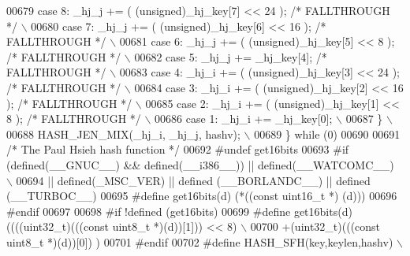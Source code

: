 \begin{DoxyCode}
{{{{{{{{00679 \textcolor{preprocessor}{    case 8:  \_hj\_j += ( (unsigned)\_hj\_key[7] << 24 );  }\textcolor{comment}{/* FALLTHROUGH */}\textcolor{preprocessor}{         \(\backslash\)}
00680 \textcolor{preprocessor}{    case 7:  \_hj\_j += ( (unsigned)\_hj\_key[6] << 16 );  }\textcolor{comment}{/* FALLTHROUGH */}\textcolor{preprocessor}{         \(\backslash\)}
00681 \textcolor{preprocessor}{    case 6:  \_hj\_j += ( (unsigned)\_hj\_key[5] << 8 );   }\textcolor{comment}{/* FALLTHROUGH */}\textcolor{preprocessor}{         \(\backslash\)}
00682 \textcolor{preprocessor}{    case 5:  \_hj\_j += \_hj\_key[4];                      }\textcolor{comment}{/* FALLTHROUGH */}\textcolor{preprocessor}{         \(\backslash\)}
00683 \textcolor{preprocessor}{    case 4:  \_hj\_i += ( (unsigned)\_hj\_key[3] << 24 );  }\textcolor{comment}{/* FALLTHROUGH */}\textcolor{preprocessor}{         \(\backslash\)}
00684 \textcolor{preprocessor}{    case 3:  \_hj\_i += ( (unsigned)\_hj\_key[2] << 16 );  }\textcolor{comment}{/* FALLTHROUGH */}\textcolor{preprocessor}{         \(\backslash\)}
00685 \textcolor{preprocessor}{    case 2:  \_hj\_i += ( (unsigned)\_hj\_key[1] << 8 );   }\textcolor{comment}{/* FALLTHROUGH */}\textcolor{preprocessor}{         \(\backslash\)}
00686 \textcolor{preprocessor}{    case 1:  \_hj\_i += \_hj\_key[0];                                                \(\backslash\)}
00687 \textcolor{preprocessor}{  \}                                                                              \(\backslash\)}
00688 \textcolor{preprocessor}{  HASH\_JEN\_MIX(\_hj\_i, \_hj\_j, hashv);                                             \(\backslash\)}
00689 \textcolor{preprocessor}{\} while (0)}
00690 
00691 \textcolor{comment}{/* The Paul Hsieh hash function */}
00692 \textcolor{preprocessor}{#undef get16bits}
00693 \textcolor{preprocessor}{#if (defined(\_\_GNUC\_\_) && defined(\_\_i386\_\_)) || defined(\_\_WATCOMC\_\_)             \(\backslash\)}
00694 \textcolor{preprocessor}{  || defined(\_MSC\_VER) || defined (\_\_BORLANDC\_\_) || defined (\_\_TURBOC\_\_)}
00695 \textcolor{preprocessor}{#define get16bits(d) (*((const uint16\_t *) (d)))}
00696 \textcolor{preprocessor}{#endif}
00697 
00698 \textcolor{preprocessor}{#if !defined (get16bits)}
00699 \textcolor{preprocessor}{#define get16bits(d) ((((uint32\_t)(((const uint8\_t *)(d))[1])) << 8)             \(\backslash\)}
00700 \textcolor{preprocessor}{                       +(uint32\_t)(((const uint8\_t *)(d))[0]) )}
00701 \textcolor{preprocessor}{#endif}
00702 \textcolor{preprocessor}{#define HASH\_SFH(key,keylen,hashv)                                               \(\backslash\)}
}}}}}}}}
\end{DoxyCode}
